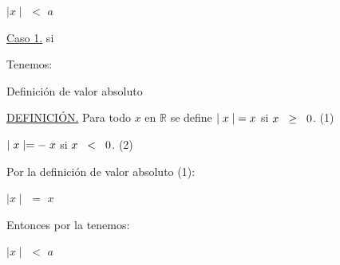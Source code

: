 \documentclass[12pt]{article}
\begin{document}
{} \vspace{0.5cm} 

{} $\mid x \mid$ $<$ $a$ \vspace{0.5cm} 

{\textcolor{palatinateblue}{{\underline{Caso 1.}} }} si {}\vspace{0.5cm}

{\textcolor{palatinateblue}{Tenemos:}} \vspace{0.5cm}

{\textcolor{carrotorange}{Definición de valor absoluto}} \vspace{0.5cm}

\begin{center}
    
{\underline{DEFINICIÓN.}} Para todo $x$ en $\mathbb{R}$ se define $\mid x\mid \hspace{0.1cm} = x$ \hspace{0.45cm} si \hspace{0.2cm} $x\hspace{0.2cm} \geq \hspace{0.2cm}0$. (1) \vspace{0.1cm}

\hspace{8.63cm} $\mid x\mid = -\hspace{0.1cm}  x$ \hspace{0.2cm} si \hspace{0.1cm} $x\hspace{0.2cm} < \hspace{0.2cm}0$. (2) 
\vspace{0.3cm}

\end{center} \vspace{0.5cm}

{\textcolor{carrotorange}{Por la definición de valor absoluto (1): }} \vspace{0.5cm}

\hspace{4cm} $\mid x \mid$ $=$ $x$ \vspace{0.5cm}

{\textcolor{palatinateblue}{Entonces por la {}}} {}  {\textcolor{palatinateblue}{tenemos:}}\vspace{0.5cm} 

\hspace{4cm} $\mid x \mid$ $<$ $a$ \vspace{0.5cm}
\end{document}
